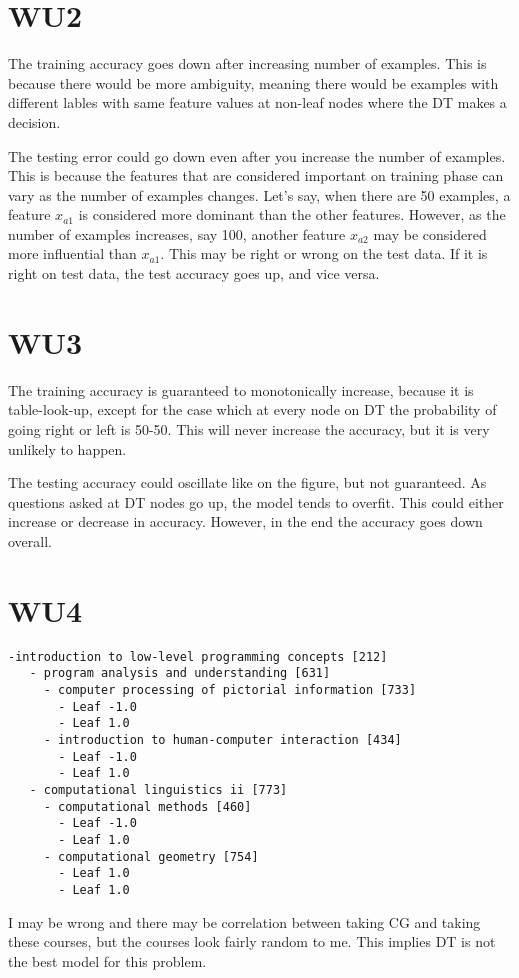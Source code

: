 \section*{WU2}
The training accuracy goes down after increasing number of examples. This is because there would be more ambiguity, meaning there would be examples with different lables with same feature values at non-leaf nodes where the DT makes a decision.

The testing error could go down even after you increase the number of examples. This is because the features that are considered important on training phase can vary as the number of examples changes. Let's say, when there are 50 examples, a feature $x_{a1}$ is considered more dominant than the other features. However, as the number of examples increases, say 100, another feature $x_{a2}$ may be considered more influential than $x_{a1}$. This may be right or wrong on the test data. If it is right on test data, the test accuracy goes up, and vice versa.

\section*{WU3}
The training accuracy is guaranteed to monotonically increase, because it is table-look-up, except for the case which at every node on DT the probability of going right or left is 50-50. This will never increase the accuracy, but it is very unlikely to happen. 

The testing accuracy could oscillate like on the figure, but not guaranteed. As questions asked at DT nodes go up, the model tends to overfit. This could either increase or decrease in accuracy. However, in the end the accuracy goes down overall.


\section*{WU4}
  \begin{verbatim}
-introduction to low-level programming concepts [212]
   - program analysis and understanding [631]
     - computer processing of pictorial information [733]
       - Leaf -1.0
       - Leaf 1.0
     - introduction to human-computer interaction [434]
       - Leaf -1.0
       - Leaf 1.0
   - computational linguistics ii [773]
     - computational methods [460]
       - Leaf -1.0
       - Leaf 1.0
     - computational geometry [754]
       - Leaf 1.0
       - Leaf 1.0
  \end{verbatim}
I may be wrong and there may be correlation between taking CG and taking these courses, but the courses look fairly random to me. This implies DT is not the best model for this problem.